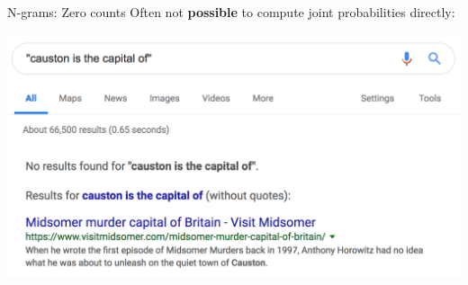 \documentclass{beamer}
\begin{document}

    

\begin{frame}{N-grams: Zero counts}
    Often not {\bf possible} to compute joint probabilities directly:
    
    \vspace{1cm}
    \includegraphics[width=\textwidth]{figures/midsomer.png}
\end{frame}
\end{document}
